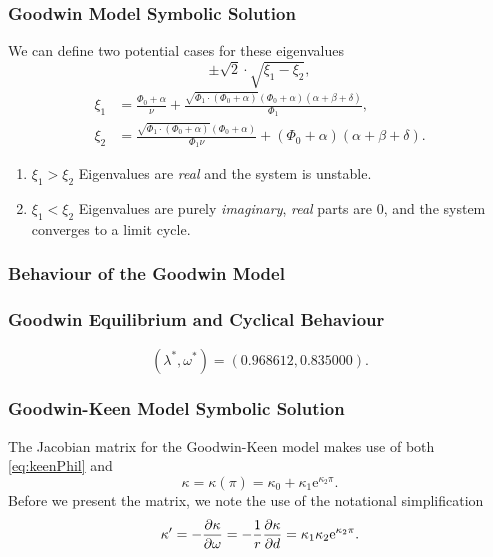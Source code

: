 \documentclass{beamer}
\begin{document}
\begin{frame}
\frametitle{Goodwin Model Symbolic Solution}
We can define two potential cases for these eigenvalues
\begin{equation*} \label{eq:goodwin_eig}
    \pm\sqrt 2\cdot\sqrt{\xi_1 - \xi_2},
\end{equation*}
\footnotesize
\begin{equation*}
\begin{split}
    \xi_1 &= \frac{\Phi_0 + \alpha}{\nu} + \frac{\sqrt{\Phi_1\cdot(\Phi_0 + \alpha)}(\Phi_0+\alpha)(\alpha+\beta+\delta)}{\Phi_1},\\
    \xi_2 &= \frac{\sqrt{\Phi_1\cdot(\Phi_0 + \alpha)}(\Phi_0 + \alpha)}{\Phi_1\nu} + (\Phi_0+\alpha)(\alpha+\beta+\delta).
    \end{split}
\end{equation*}
\normalsize
\begin{enumerate}
    \item $\xi_1 > \xi_2$ Eigenvalues are \emph{real} and the system is unstable.
    \item $\xi_1 < \xi_2$ Eigenvalues are purely \emph{imaginary}, \emph{real} parts are 0, and the system converges to a limit cycle.
\end{enumerate}
\end{frame}
\begin{frame}
\frametitle{Behaviour of the Goodwin Model}
\begin{center}
\label{frequencyGraph}

\end{center}
\end{frame}
\begin{frame}
\frametitle{Goodwin Equilibrium and Cyclical Behaviour}
\begin{center}
\label{frequencyGraph}

\begin{equation*}
    (\lambda^\ast, \omega^\ast) = (0.968612, 0.835000).
\end{equation*}
\end{center}
\end{frame}
\begin{frame}
\frametitle{Goodwin-Keen Model Symbolic Solution}
The Jacobian matrix for the Goodwin-Keen model makes use of both \eqref{eq:keenPhil} and 
\begin{equation*} \label{eq:keenKappa}
    \kappa=\kappa(\pi) = \kappa_0 + \kappa_1\mathrm e^{\kappa_2\pi}.
\end{equation*}
Before we present the matrix, we note the use of the notational simplification
\begin{equation*}
    \kappa^\prime = -\pdv{\kappa}{\omega} = -\frac{1}{r}\pdv{\kappa}{d} = \kappa_1\kappa_2\mathrm e^{\kappa_2\pi}.
\end{equation*}
\end{frame}
\end{document}
